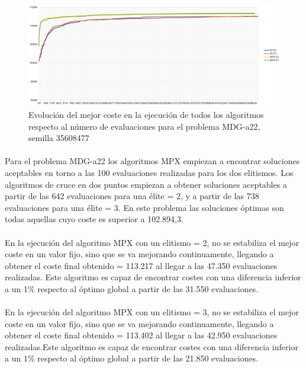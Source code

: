 	\begin{figure}[H]
		\centering
		\includegraphics[scale=0.3]{img/35608477_MDG-a_22_n2000_m200.png}
		\caption{Evolución del mejor coste en la ejecución de todos los algoritmos respecto al número de evaluaciones para el problema MDG-a22, semilla 35608477}
		\label{MDG-a_22_historico}
	\end{figure}

	\paragraph{}Para el problema MDG-a22 los algoritmos MPX empiezan a encontrar soluciones aceptables en torno a las 100 evaluaciones realizadas para los dos elitismos. Los algoritmos de cruce en dos puntos empiezan a obtener soluciones aceptables a partir de las 642 evaluaciones para una élite = 2, y a partir de las 738 evaluaciones para una élite = 3. En este problema las soluciones óptimas son todas aquellas cuyo coste es superior a 102.894,3.
	
	\paragraph{}En la ejecución del algoritmo MPX con un elitismo = 2, no se estabiliza el mejor coste en un valor fijo, sino que se va mejorando continuamente, llegando a obtener el coste final obtenido = 113.217 al llegar a las 47.350 evaluaciones realizadas. Este algoritmo es capaz de encontrar costes con una diferencia inferior a un 1\% respecto al óptimo global a partir de las 31.550 evaluaciones.
	
	\paragraph{}En la ejecución del algoritmo MPX con un elitismo = 3, no se estabiliza el mejor coste en un valor fijo, sino que se va mejorando continuamente, llegando a obtener el coste final obtenido = 113.402 al llegar a las 42.950 evaluaciones realizadas.Este algoritmo es capaz de encontrar costes con una diferencia inferior a un 1\% respecto al óptimo global a partir de las 21.850 evaluaciones.


